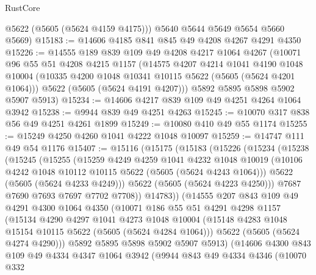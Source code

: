 \begin{lexlean}{RustCore}
\begin{coremodule}
        @5622
        (@5605 (@5624 @4159 @4175)))
      @5640
      @5644
      @5649
      @5654
      @5660
      @5669)
@15183 := @14606 @4185 @841 @845 @49 @4208 @4267 @4291 @4350
@15226 := @14555
    @189
    @839
    @109
    @49
    @4208
    @4217
    @1064
    @4267
    (@10071
      @96
      @55
      @51
      @4208
      @4215
      @1157
      (@14575
        @4207
        @4214
        @1041
        @4190
        @1048
        @10004
        (@10335 @4200 @1048 @10341 @10115 @5622 (@5605 (@5624 @4201 @1064)))
        @5622
        (@5605 (@5624 @4191 @4207)))
      @5892
      @5895
      @5898
      @5902
      @5907
      @5913)
@15234 := @14606 @4217 @839 @109 @49 @4251 @4264 @1064 @3942
@15238 := @9944 @839 @49 @4251 @4263
@15245 := @10070 @317 @838 @56 @49 @4251 @4261 @1899
@15249 := @10080 @410 @49 @55 @1174
@15255 := @15249 @4250 @4260 @1041 @4222 @1048 @10097
@15259 := @14747 @111 @49 @54 @1176
@15407 := @15116
    (@15175
      (@15183
        (@15226
          (@15234
            (@15238
              (@15245
                (@15255
                  (@15259
                    @4249
                    @4259
                    @1041
                    @4232
                    @1048
                    @10019
                    (@10106 @4242 @1048 @10112 @10115 @5622 (@5605 (@5624 @4243 @1064)))
                    @5622
                    (@5605 (@5624 @4233 @4249)))
                  @5622
                  (@5605 (@5624 @4223 @4250)))
                @7687
                @7690
                @7693
                @7697
                @7702
                @7708))
            @14783))
        (@14555
          @207
          @843
          @109
          @49
          @4291
          @4300
          @1064
          @4350
          (@10071
            @186
            @55
            @51
            @4291
            @4298
            @1157
            (@15134
              @4290
              @4297
              @1041
              @4273
              @1048
              @10004
              (@15148 @4283 @1048 @15154 @10115 @5622 (@5605 (@5624 @4284 @1064)))
              @5622
              (@5605 (@5624 @4274 @4290)))
            @5892
            @5895
            @5898
            @5902
            @5907
            @5913)
          (@14606
            @4300
            @843
            @109
            @49
            @4334
            @4347
            @1064
            @3942
            (@9944
              @843
              @49
              @4334
              @4346
              (@10070
                @332

\end{coremodule}
\end{lexlean}
